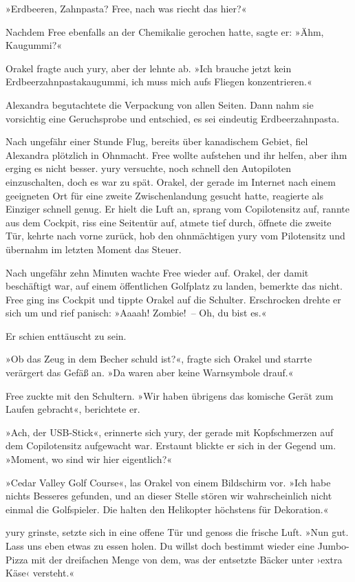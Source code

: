 »Erdbeeren, Zahnpasta? Free, nach was riecht das hier?«

Nachdem Free ebenfalls an der Chemikalie gerochen hatte, sagte er: »Ähm, Kaugummi?«

Orakel fragte auch yury, aber der lehnte ab. »Ich brauche jetzt kein Erdbeerzahnpastakaugummi, ich muss mich aufs Fliegen konzentrieren.«

Alexandra begutachtete die Verpackung von allen Seiten. Dann nahm sie vorsichtig eine Geruchsprobe und entschied, es sei eindeutig Erdbeerzahnpasta.

Nach ungefähr einer Stunde Flug, bereits über kanadischem Gebiet, fiel Alexandra plötzlich in Ohnmacht. Free wollte aufstehen und ihr helfen, aber ihm erging es nicht besser. yury versuchte, noch schnell den Autopiloten einzuschalten, doch es war zu spät. Orakel, der gerade im Internet nach einem geeigneten Ort für eine zweite Zwischenlandung gesucht hatte, reagierte als Einziger schnell genug. Er hielt die Luft an, sprang vom Copilotensitz auf, rannte aus dem Cockpit, riss eine Seitentür auf, atmete tief durch, öffnete die zweite Tür, kehrte nach vorne zurück, hob den ohnmächtigen yury vom Pilotensitz und übernahm im letzten Moment das Steuer.

Nach ungefähr zehn Minuten wachte Free wieder auf. Orakel, der damit beschäftigt war, auf einem öffentlichen Golfplatz zu landen, bemerkte das nicht. Free ging ins Cockpit und tippte Orakel auf die Schulter. Erschrocken drehte er sich um und rief panisch: »Aaaah! Zombie!~– Oh, du bist es.«

Er schien enttäuscht zu sein.

»Ob das Zeug in dem Becher schuld ist?«, fragte sich Orakel und starrte verärgert das Gefäß an. »Da waren aber keine Warnsymbole drauf.«

Free zuckte mit den Schultern. »Wir haben übrigens das komische Gerät zum Laufen gebracht«, berichtete er.

»Ach, der USB-Stick«, erinnerte sich yury, der gerade mit Kopfschmerzen auf dem Copilotensitz aufgewacht war. Erstaunt blickte er sich in der Gegend um. »Moment, wo sind wir hier eigentlich?«

»Cedar Valley Golf Course«, las Orakel von einem Bildschirm vor. »Ich habe nichts Besseres gefunden, und an dieser Stelle stören wir wahrscheinlich nicht einmal die Golfspieler. Die halten den Helikopter höchstens für Dekoration.«

yury grinste, setzte sich in eine offene Tür und genoss die frische Luft. »Nun gut. Lass uns eben etwas zu essen holen. Du willst doch bestimmt wieder eine Jumbo-Pizza mit der dreifachen Menge von dem, was der entsetzte Bäcker unter ›extra Käse‹ versteht.«


